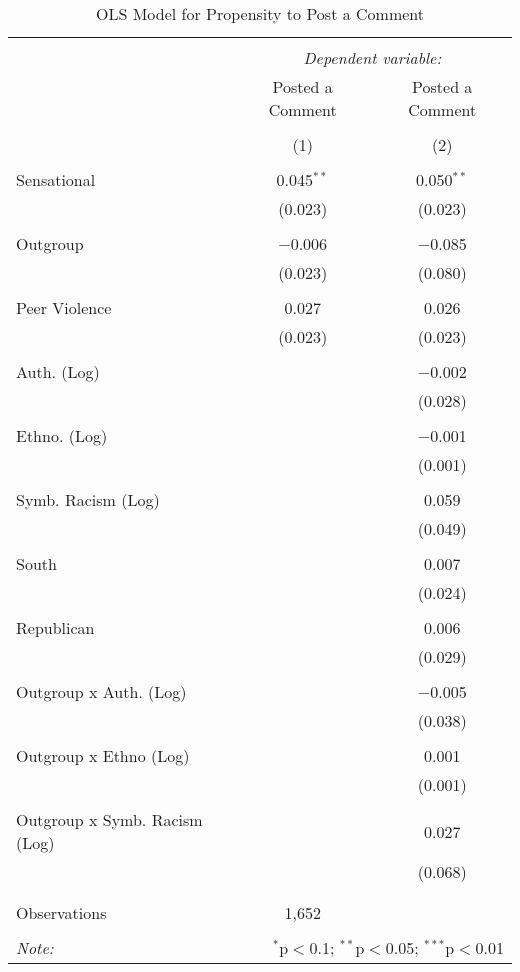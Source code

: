 
\begin{table}[H] \centering 
  \caption{OLS Model for Propensity to Post a Comment} 
  \label{} 
\begin{tabular}{@{\extracolsep{5pt}}lcc} 
\\[-1.8ex]\hline 
\hline \\[-1.8ex] 
 & \multicolumn{2}{c}{\textit{Dependent variable:}} \\ 
\cline{2-3} 
 & Posted a Comment & Posted a Comment \\ 
\\[-1.8ex] & (1) & (2)\\ 
\hline \\[-1.8ex] 
 Sensational & 0.045$^{**}$ & 0.050$^{**}$ \\ 
  & (0.023) & (0.023) \\ 
  & & \\ 
 Outgroup & $-$0.006 & $-$0.085 \\ 
  & (0.023) & (0.080) \\ 
  & & \\ 
 Peer Violence & 0.027 & 0.026 \\ 
  & (0.023) & (0.023) \\ 
  & & \\ 
 Auth. (Log) &  & $-$0.002 \\ 
  &  & (0.028) \\ 
  & & \\ 
 Ethno. (Log) &  & $-$0.001 \\ 
  &  & (0.001) \\ 
  & & \\ 
 Symb. Racism (Log) &  & 0.059 \\ 
  &  & (0.049) \\ 
  & & \\ 
 South &  & 0.007 \\ 
  &  & (0.024) \\ 
  & & \\ 
 Republican &  & 0.006 \\ 
  &  & (0.029) \\ 
  & & \\ 
 Outgroup x Auth. (Log) &  & $-$0.005 \\ 
  &  & (0.038) \\ 
  & & \\ 
 Outgroup x Ethno (Log) &  & 0.001 \\ 
  &  & (0.001) \\ 
  & & \\ 
 Outgroup x Symb. Racism (Log) &  & 0.027 \\ 
  &  & (0.068) \\ 
  & & \\ 
\hline \\[-1.8ex] 
Observations & 1,652 &  \\ 
\hline 
\hline \\[-1.8ex] 
\textit{Note:}  & \multicolumn{2}{r}{$^{*}$p$<$0.1; $^{**}$p$<$0.05; $^{***}$p$<$0.01} \\ 
\end{tabular} 
\end{table} 
